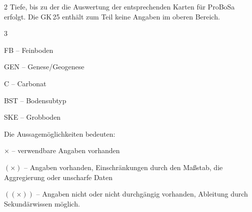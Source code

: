 \begin{table}[t]
\begin{threeparttable}
\begin{tablenotes}
    		\item[2] Tiefe, bis zu der die Auswertung der entsprechenden Karten für ProBoSa erfolgt. Die GK\,25 enthält zum Teil keine Angaben im oberen Bereich.
		\item[3] \begin{inparaitem}
		\item FB -- Feinboden 
		\item GEN -- Genese/Geogenese 
		\item C -- Carbonat 
		\item BST -- Bodensubtyp
		\item SKE -- Grobboden
		\end{inparaitem}\newline
		Die Aussagemöglichkeiten bedeuten:
		\begin{asparaitem}
		\item	$\times$ -- verwendbare Angaben vorhanden
		\item $(\times)$ -- Angaben vorhanden, Einschränkungen durch den Maßstab, die Aggregierung oder unscharfe Daten
    \item $((\times))$ -- Angaben nicht oder nicht durchgängig vorhanden, Ableitung durch Sekundärwissen möglich.
		\end{asparaitem}
  \end{tablenotes}
 \end{threeparttable}   
\end{table}%


%



